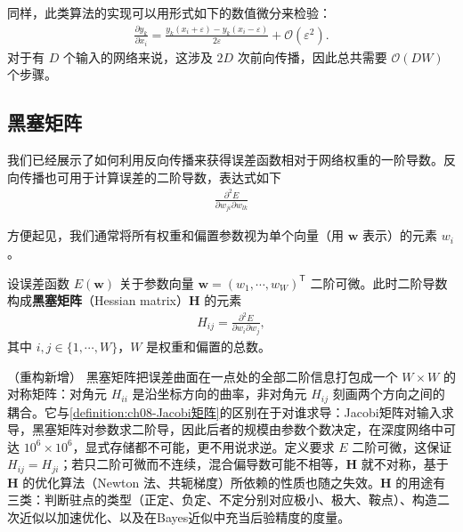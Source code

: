 \documentclass[../../main.tex]{subfiles}
\begin{document}
同样，此类算法的实现可以用形式如下的数值微分来检验：
\begin{align}
\frac{\partial y_k}{\partial x_i}=\frac{y_k\left(x_i+\varepsilon\right)-y_k\left(x_i-\varepsilon\right)}{2\varepsilon}+\mathcal{O}\left(\varepsilon^{2}\right).
\label{align:ch08-Jacobi数值}
\end{align}
对于有 $D$ 个输入的网络来说，这涉及 $2D$ 次前向传播，因此总共需要 $\mathcal{O}(DW)$ 个步骤。

\subsection{黑塞矩阵}\label{subsection:ch08-黑塞矩阵}

我们已经展示了如何利用反向传播来获得误差函数相对于网络权重的一阶导数。反向传播也可用于计算误差的二阶导数，表达式如下
\begin{align}
\frac{\partial^{2}E}{\partial w_{ji}\partial w_{lk}}
\label{align:ch08-二阶导数}
\end{align}

方便起见，我们通常将所有权重和偏置参数视为单个向量（用 $\mathbf{w}$ 表示）的元素 $w_i$。

\begin{definition}[黑塞矩阵]\label{definition:ch08-黑塞矩阵}
设误差函数 $E(\mathbf{w})$ 关于参数向量 $\mathbf{w}=(w_1,\cdots,w_W)^{\mathsf T}$ 二阶可微。此时二阶导数构成\textbf{黑塞矩阵}（Hessian matrix）$\mathbf{H}$ 的元素
\begin{align}
H_{ij}=\frac{\partial^{2}E}{\partial w_i\partial w_j},
\label{align:ch08-黑塞}
\end{align}
其中 $i,j\in\{1,\cdots,W\}$，$W$ 是权重和偏置的总数。
\end{definition}

\begin{remark}（重构新增）
黑塞矩阵把误差曲面在一点处的全部二阶信息打包成一个 $W\times W$ 的对称矩阵：对角元 $H_{ii}$ 是沿坐标方向的曲率，非对角元 $H_{ij}$ 刻画两个方向之间的耦合。它与\cref{definition:ch08-Jacobi矩阵}的区别在于对谁求导：Jacobi矩阵对输入求导，黑塞矩阵对参数求二阶导，因此后者的规模由参数个数决定，在深度网络中可达 $10^{6}\times10^{6}$，显式存储都不可能，更不用说求逆。定义要求 $E$ 二阶可微，这保证 $H_{ij}=H_{ji}$；若只二阶可微而不连续，混合偏导数可能不相等，$\mathbf{H}$ 就不对称，基于 $\mathbf{H}$ 的优化算法（Newton 法、共轭梯度）所依赖的性质也随之失效。$\mathbf{H}$ 的用途有三类：判断驻点的类型（正定、负定、不定分别对应极小、极大、鞍点）、构造二次近似以加速优化、以及在Bayes近似中充当后验精度的度量。
\end{remark}
\end{document}
